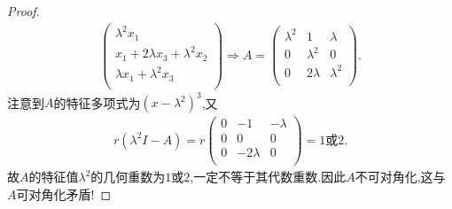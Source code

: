 \documentclass[../../main.tex]{subfiles}%
\begin{document}
\begin{proof}
\begin{align*}
\begin{pmatrix}
\lambda^2x_1\\
x_1+2\lambda x_3+\lambda^2x_2\\
\lambda x_1+\lambda^2x_3\\
\end{pmatrix}\Longrightarrow A=\begin{pmatrix}
\lambda^2&		1&		\lambda\\
0&		\lambda^2&		0\\
0&		2\lambda&		\lambda^2\\
\end{pmatrix}.
\end{align*}
注意到$A$的特征多项式为$(x-\lambda^2)^3$,又
\begin{align*}
r(\lambda^2I-A)=r\begin{pmatrix}
0&		-1&		-\lambda\\
0&		0&		0\\
0&		-2\lambda&		0\\
\end{pmatrix}=1\text{或}2.
\end{align*}
故$A$的特征值$\lambda^2$的几何重数为$1$或$2$,一定不等于其代数重数.因此$A$不可对角化,这与$A$可对角化矛盾!

\end{proof}
\end{document}
